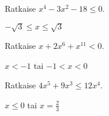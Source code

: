 \begin{tehtava}
    Ratkaise $x^4-3x^2-18 \le 0$.
    \begin{vastaus}
    $-\sqrt{3}\le x \le \sqrt{3}$
    \end{vastaus}
\end{tehtava}

\begin{tehtava}
    Ratkaise $x+2x^6+x^{11}<0$.
    \begin{vastaus}
    $x<-1$ tai $ -1<x<0$
    \end{vastaus}
\end{tehtava}

\begin{tehtava}
    Ratkaise $4 x^5+9 x^3 \le 12 x^4$.
    \begin{vastaus}
    $x\le0$ tai $x=\frac{2}{3}$
    \end{vastaus}
\end{tehtava}
